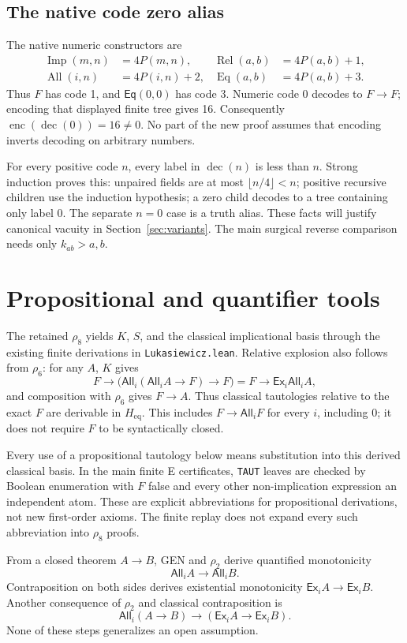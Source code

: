\documentclass[11pt,letterpaper]{article}
\theoremstyle{definition}\newtheorem{definition}[theorem]{Definition}
\theoremstyle{remark}\newtheorem{remark}[theorem]{Remark}
\newcommand{\Eq}{\mathsf{Eq}}
\newcommand{\All}{\mathsf{All}}
\newcommand{\Ex}{\mathsf{Ex}}
\newcommand{\enc}{\operatorname{enc}}
\newcommand{\dec}{\operatorname{dec}}
\newcommand{\To}{\rightarrow}
\newcommand{\Hh}{H_{\mathrm{eq}}}
\newcommand{\file}[1]{\begingroup\small\ttfamily\nolinkurl{#1}\endgroup}
\begin{document}
\subsection{The native code zero alias}
The native numeric constructors are
\begin{align*}
\operatorname{Imp}(m,n)&=4P(m,n), &\operatorname{Rel}(a,b)&=4P(a,b)+1,\\
\operatorname{All}(i,n)&=4P(i,n)+2, &\operatorname{Eq}(a,b)&=4P(a,b)+3.
\end{align*}
Thus $F$ has code 1, and $\Eq(0,0)$ has code 3. Numeric code 0 decodes to $F\To F$; encoding that displayed finite tree gives 16. Consequently $\enc(\dec(0))=16\ne0$. No part of the new proof assumes that encoding inverts decoding on arbitrary numbers.

For every positive code $n$, every label in $\dec(n)$ is less than $n$. Strong induction proves this: unpaired fields are at most $\lfloor n/4\rfloor<n$; positive recursive children use the induction hypothesis; a zero child decodes to a tree containing only label 0. The separate $n=0$ case is a truth alias. These facts will justify canonical vacuity in Section~\ref{sec:variants}. The main surgical reverse comparison needs only $k_{ab}>a,b$.

\section{Propositional and quantifier tools}\label{sec:tools}
The retained $\rho_8$ yields $K$, $S$, and the classical implicational basis through the existing finite derivations in \file{Lukasiewicz.lean}. Relative explosion also follows from $\rho_6$: for any $A$, $K$ gives
\[
 F\To\bigl(\All_i(\All_i A\To F)\To F\bigr)
   =F\To\Ex_i\All_i A,
\]
and composition with $\rho_6$ gives $F\To A$. Thus classical tautologies relative to the exact $F$ are derivable in $\Hh$. This includes $F\To\All_i F$ for every $i$, including 0; it does not require $F$ to be syntactically closed.

Every use of a propositional tautology below means substitution into this derived classical basis. In the main finite E certificates, \file{TAUT} leaves are checked by Boolean enumeration with $F$ false and every other non-implication expression an independent atom. These are explicit abbreviations for propositional derivations, not new first-order axioms. The finite replay does not expand every such abbreviation into $\rho_8$ proofs.

From a closed theorem $A\To B$, GEN and $\rho_2$ derive quantified monotonicity
\[
 \All_i A\To\All_i B.
\]
Contraposition on both sides derives existential monotonicity $\Ex_i A\To\Ex_i B$. Another consequence of $\rho_2$ and classical contraposition is
\begin{equation}\label{eq:allimpex}
 \All_i(A\To B)\To(\Ex_i A\To\Ex_i B).
\end{equation}
None of these steps generalizes an open assumption.
\end{document}
